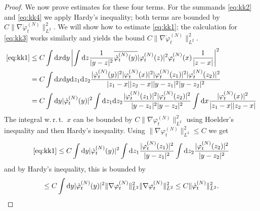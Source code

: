 \documentclass[11pt,a4paper,draft,DIV11]{scrartcl}	%
\newcommand{\di}{\textrm{d}}		%
\newcommand{\cc}[1]{\overline{#1}}	%
\newcommand{\norm}[1]{\lVert#1\rVert}	%
\newcommand{\ph}{\varphi_t^{(N)}}	%
\newcommand{\phdot}{\dot{\varphi}_t^{(N)}}	%
\newcommand{\bd}{\begin{displaymath}}			%
\newcommand{\ed}{\end{displaymath}}
\begin{document}
\begin{proof}
We now prove estimates for these four terms. For the summands \eqref{eq:kk2} and \eqref{eq:kk4} we apply Hardy's inequality; both terms are bounded by $C \norm{\nabla \phdot}_{L^2}^2$.
We will show how to estimate \eqref{eq:kk1}; the calculation for \eqref{eq:kk3} works similarly and yields the bound $C \norm{\nabla \phdot}_{L^2}^2$.
\begin{align*}
\eqref{eq:kk1} & \leq C \int \di x \di y \left\lvert \int \di z \frac{1}{\lvert y-z\rvert^2} \cc{\phdot(y)} \lvert \ph(z)\rvert^2 {\ph(x)} \frac{1}{\lvert z-x\rvert} \right\rvert^2 \\
& = C \int \di x \di y \di z_1 \di z_2 \frac{\lvert\phdot(y)\rvert^2 \lvert \ph(x)\rvert^2 \lvert \ph(z_1)\rvert^2 \lvert \ph(z_2)\rvert^2}{\lvert z_1-x\rvert \lvert z_2 -x\rvert \lvert y-z_1\rvert^2 \lvert y-z_2\rvert^2} \\
& = C \int \di y \lvert\phdot(y)\rvert^2 \int \di z_1 \di z_2 \frac{\lvert \ph(z_1)\rvert^2 \lvert \ph(z_2)\rvert^2}{\lvert y-z_1\rvert^2 \lvert y-z_2\rvert^2} \int \di x \frac{\lvert \ph(x)\rvert^2}{\lvert z_1-x\rvert \lvert z_2 - x\rvert}
\end{align*}
The integral w.\,r.\,t.\ $x$ can be bounded by $C \norm{\nabla \ph}_{L^2}^2$ using Hoelder's inequality and then Hardy's inequality. Using $\norm{\nabla \ph}_{L^2}^2 \leq C$ we get
\bd
\eqref{eq:kk1} \leq C \int \di y \lvert\phdot(y)\rvert^2 \int \di z_1 \frac{\lvert \ph(z_1)\rvert^2 }{\lvert y-z_1\rvert^2 } \int \di z_2 \frac{\lvert \ph(z_2)\rvert^2}{\lvert y-z_2\rvert^2}
\ed
and by Hardy's inequality, this is bounded by
\bd
\leq C \int \di y \lvert \phdot(y)\rvert^2 \norm{\nabla \ph}_{L^2}^2 \norm{\nabla \ph}_{L^2}^2 \leq C \norm{\phdot}_{L^2}^2. \qedhere
\ed
\end{proof}

\cite{*}


\end{document}
